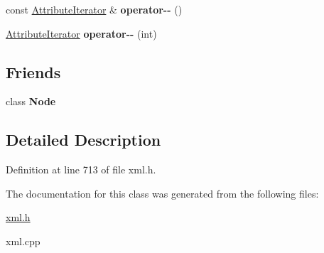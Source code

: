 \begin{DoxyCompactItemize}
\item 
\hypertarget{classphys_1_1xml_1_1AttributeIterator_aa26f070fa194c529285bb094e23215de}{
const \hyperlink{classphys_1_1xml_1_1AttributeIterator}{AttributeIterator} \& {\bfseries operator-\/-\/} ()}
\label{de/d78/classphys_1_1xml_1_1AttributeIterator_aa26f070fa194c529285bb094e23215de}

\item 
\hypertarget{classphys_1_1xml_1_1AttributeIterator_ae46ebed7b404ae085c47984f615a7597}{
\hyperlink{classphys_1_1xml_1_1AttributeIterator}{AttributeIterator} {\bfseries operator-\/-\/} (int)}
\label{de/d78/classphys_1_1xml_1_1AttributeIterator_ae46ebed7b404ae085c47984f615a7597}

\end{DoxyCompactItemize}
\subsection*{Friends}
\begin{DoxyCompactItemize}
\item 
\hypertarget{classphys_1_1xml_1_1AttributeIterator_a6db9d28bd448a131448276ee03de1e6d}{
class {\bfseries Node}}
\label{de/d78/classphys_1_1xml_1_1AttributeIterator_a6db9d28bd448a131448276ee03de1e6d}

\end{DoxyCompactItemize}


\subsection{Detailed Description}


Definition at line 713 of file xml.h.



The documentation for this class was generated from the following files:\begin{DoxyCompactItemize}
\item 
\hyperlink{xml_8h}{xml.h}\item 
xml.cpp\end{DoxyCompactItemize}
